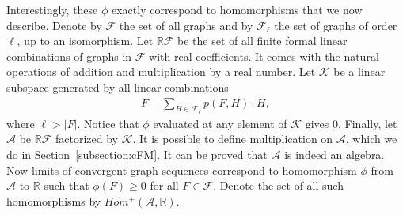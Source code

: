 \documentclass[12pt]{article}
\theoremstyle{definition}
\theoremstyle{remark}
\renewcommand{\geq}{\geqslant}
\begin{document}
Interestingly, these $\phi$ exactly correspond to homomorphisms that we now describe.
Denote by $\mathcal{F}$ the set of all graphs and by $\mathcal{F}_\ell$ the set of graphs of order $\ell$, up to an isomorphism.
Let $\mathbb{R}\mathcal{F}$ be the set of all finite formal linear combinations of graphs in $\mathcal{F}$ with real coefficients. It comes with the natural operations of addition and multiplication by a real number.
Let $\mathcal{K}$ be a linear subspace generated by all linear combinations
\begin{align}\label{eq:zero}
F - \sum_{H \in \mathcal{F}_\ell} p(F,H) \cdot H, 
\end{align}
where $\ell > |F|$. Notice that $\phi$ evaluated at any element of $\mathcal{K}$ gives 0.
Finally, let $\mathcal{A}$ be $\mathbb{R}\mathcal{F}$ factorized by $\mathcal{K}$.
It is possible to define multiplication on $\mathcal{A}$, which we do in Section~\ref{subsection:cFM}.
It can be proved that $\mathcal{A}$ is indeed an algebra. 
Now limits of convergent graph sequences correspond to homomorphism $\phi$ from $\mathcal{A}$ to $\mathbb{R}$ such that $\phi(F) \geq 0$ for all $F \in \mathcal{F}$.
Denote the set of all such homomorphisms by $Hom^+(\mathcal{A},\mathbb{R})$.
\end{document}
